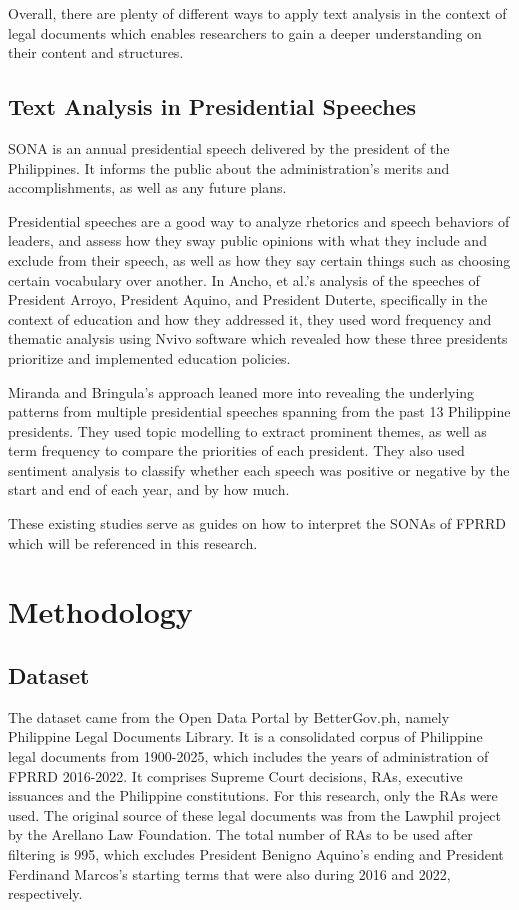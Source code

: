 \documentclass[conference]{IEEEtran}
\begin{document}
Overall, there are plenty of different ways to apply text analysis in the context of legal documents which enables researchers to gain a deeper understanding on their content and structures.

\subsection{Text Analysis in Presidential Speeches}
SONA is an annual presidential speech delivered by the president of the Philippines. It informs the public about the administration's merits and accomplishments, as well as any future plans.

Presidential speeches are a good way to analyze rhetorics and speech behaviors of leaders, and assess how they sway public opinions with what they include and exclude from their speech, as well as how they say certain things such as choosing certain vocabulary over another. In Ancho, et al.'s\cite{education} analysis of the speeches of President Arroyo, President Aquino, and President Duterte, specifically in the context of education and how they addressed it, they used word frequency and thematic analysis using Nvivo software which revealed how these three presidents prioritize and implemented education policies.

Miranda and Bringula's\cite{sona} approach leaned more into revealing the underlying patterns from multiple presidential speeches spanning from the past 13 Philippine presidents. They used topic modelling to extract prominent themes, as well as term frequency to compare the priorities of each president. They also used sentiment analysis to classify whether each speech was positive or negative by the start and end of each year, and by how much.

These existing studies serve as guides on how to interpret the SONAs of FPRRD which will be referenced in this research.

\section{Methodology}
\subsection{Dataset}
The dataset came from the Open Data Portal by BetterGov.ph, namely Philippine Legal Documents Library\cite{dataset}. It is a consolidated corpus of Philippine legal documents from 1900-2025, which includes the years of administration of FPRRD 2016-2022. It comprises Supreme Court decisions, RAs, executive issuances and the Philippine constitutions. For this research, only the RAs were used. The original source of these legal documents was from the Lawphil project by the Arellano Law Foundation. The total number of RAs to be used after filtering is 995, which excludes President Benigno Aquino's ending and President Ferdinand Marcos's starting terms that were also during 2016 and 2022, respectively.
\end{document}
